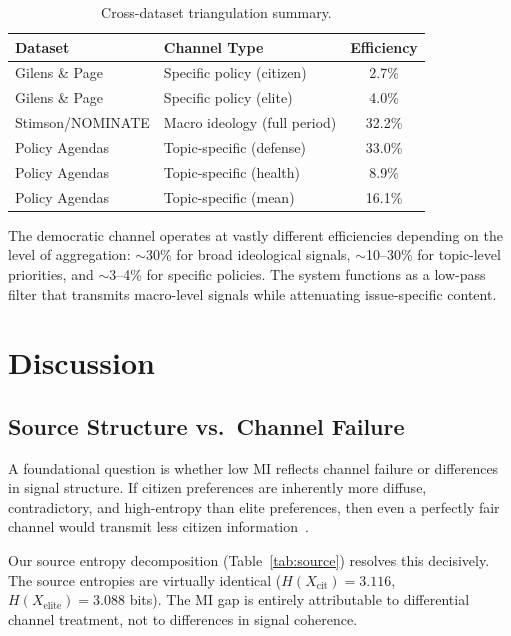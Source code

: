 \documentclass[twocolumn,10pt]{article}
\begin{document}
\begin{table}[t]
\centering
\caption{Cross-dataset triangulation summary.}
\label{tab:triangulation}
\begin{tabular}{@{}llc@{}}
\toprule
Dataset & Channel Type & Efficiency \\
\midrule
Gilens \& Page & Specific policy (citizen) & 2.7\% \\
Gilens \& Page & Specific policy (elite) & 4.0\% \\
Stimson/NOMINATE & Macro ideology (full period) & 32.2\% \\
Policy Agendas & Topic-specific (defense) & 33.0\% \\
Policy Agendas & Topic-specific (health) & 8.9\% \\
Policy Agendas & Topic-specific (mean) & 16.1\% \\
\bottomrule
\end{tabular}
\end{table}

The democratic channel operates at vastly different efficiencies depending on the level of aggregation: $\sim$30\% for broad ideological signals, $\sim$10--30\% for topic-level priorities, and $\sim$3--4\% for specific policies.  The system functions as a low-pass filter that transmits macro-level signals while attenuating issue-specific content.

\section{Discussion}
\label{sec:discussion}

\subsection{Source Structure vs.\ Channel Failure}

A foundational question is whether low MI reflects channel failure or differences in signal structure.  If citizen preferences are inherently more diffuse, contradictory, and high-entropy than elite preferences, then even a perfectly fair channel would transmit less citizen information~\citep{cover2006}.

Our source entropy decomposition (Table~\ref{tab:source}) resolves this decisively.  The source entropies are virtually identical ($H(X_\text{cit}) = 3.116$, $H(X_\text{elite}) = 3.088$ bits).  The MI gap is entirely attributable to differential channel treatment, not to differences in signal coherence.
\end{document}
